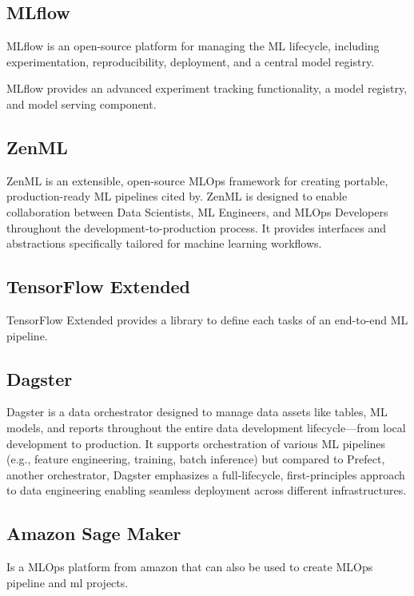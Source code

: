 \subsection{MLflow}\label{subsec:mlflow}
MLflow is an open-source platform for managing the ML lifecycle, including experimentation, reproducibility,
deployment, and a central model registry.\cite{mlflow}

MLflow provides an advanced experiment tracking functionality, a model registry, and
model serving component\cite{Kreuzberger2022MachineLO}.

\subsection{ZenML}\label{subsec:zenml}
ZenML is an extensible, open-source MLOps framework for creating portable, production-ready ML pipelines cited by\cite{blockchain-mlops}.
ZenML is designed to enable collaboration between Data Scientists, ML Engineers, and MLOps Developers throughout the development-to-production process\cite{landscape}.
It provides interfaces and abstractions specifically tailored for machine learning workflows.

\subsection{TensorFlow Extended}\label{subsec:tensorflow-extended}
TensorFlow Extended provides a library to define each tasks of an end-to-end ML
pipeline\cite{Kreuzberger2022MachineLO}.

\subsection{Dagster}\label{subsec:dagster}
Dagster is a data orchestrator designed to manage data assets like tables, ML models, and reports throughout the entire data development lifecycle—from local development to production\cite{landscape}.
It supports orchestration of various ML pipelines (e.g., feature engineering, training, batch inference) but
compared to Prefect, another orchestrator, Dagster emphasizes a full-lifecycle, first-principles approach to data engineering enabling seamless deployment across different infrastructures\cite{landscape}.

\subsection{Amazon Sage Maker}\label{subsec:amazon-sage-maker}
Is a MLOps platform from amazon that can also be used to create MLOps pipeline and ml projects.